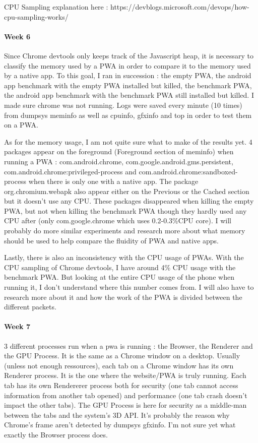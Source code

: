 \documentclass{kththesis}
\begin{document}
CPU Sampling explanation here : https://devblogs.microsoft.com/devops/how-cpu-sampling-works/

\paragraph{Week 6}
Since Chrome devtools only keeps track of the Javascript heap, it is necessary to classify the memory used by a PWA in order to compare it to the memory used by a native app.
To this goal, I ran in succession : the empty PWA, the android app benchmark with the empty PWA installed but killed, the benchmark PWA, the android app benchmark with the benchmark PWA still installed but killed. I made sure chrome was not running. Logs were saved every minute (10 times) from dumpsys meminfo as well as cpuinfo, gfxinfo and top in order to test them on a PWA. 

As for the memory usage, I am not quite sure what to make of the results yet.
4 packages appear on the foreground (Foreground section of meminfo) when running a PWA : com.android.chrome, com.google.android.gms.persistent,  com.android.chrome:privileged-process and com.android.chrome:sandboxed-process when there is only one with a native app. The package org.chromium.webapk also appear either on the Previous or the Cached section but it doesn't use any CPU.
These packages disappeared when killing the empty PWA, but not when killing the benchmark PWA though they hardly used any CPU after (only com.google.chrome which uses 0.2-0.3\%CPU core). 
I will probably do more similar experiments and research more about what memory should be used to help compare the fluidity of PWA and native apps.

Lastly, there is also an inconsistency with the CPU usage of PWAs. With the CPU sampling of Chrome devtools, I have around 4\% CPU usage with the benchmark PWA. But looking at the entire CPU usage of the phone when running it, I don't understand where this number comes from. I will also have to research more about it and how the work of the PWA is divided between the different packets.

\paragraph{Week 7}
3 different processes run when a pwa is running : the Browser, the Renderer and the GPU Process. It is the same as a Chrome window on a desktop. Usually (unless not enough ressources), each tab on a Chrome window has its own Renderer process. It is the one where the website/PWA is truly running. Each tab has its own Rendererer process both for security (one tab cannot access information from another tab opened) and performance (one tab crash doesn't impact the other tabs). The GPU Process is here for security as a middle-man between the tabs and the system's 3D API. It's probably the reason why Chrome's frame aren't detected by dumpsys gfxinfo. I'm not sure yet what exactly the Browser process does.
\end{document}
